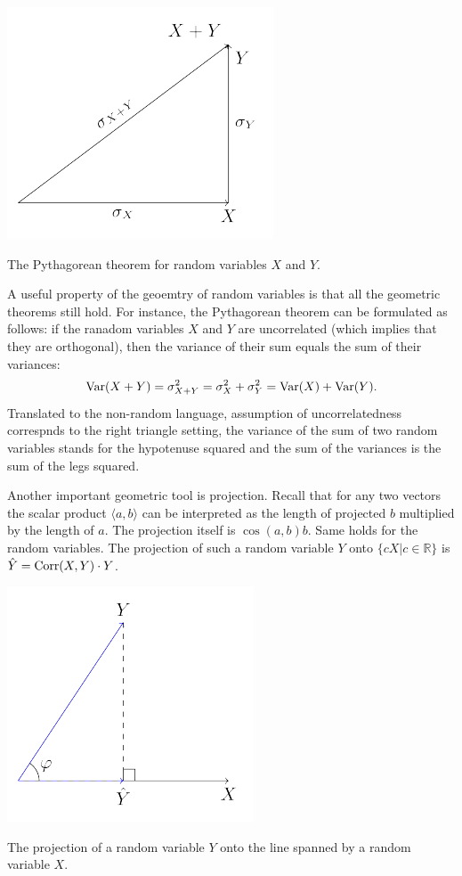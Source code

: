 
\begin{marginfigure}[10\baselineskip]
\includegraphics{figures/01_pythagorean_theorem.pdf}
\caption{The Pythagorean theorem for random variables $X$ and $Y$.}
\label{fig:rv_pyth}
\end{marginfigure}

A useful property of the geoemtry of random variables is that all the
geometric theorems still hold. For instance, the Pythagorean theorem can
be formulated as follows: if the ranadom variables $X$ and $Y$ are uncorrelated
(which implies that they are orthogonal), then the variance of their sum equals
the sum of their variances:
\[
\operatorname{Var}(X + Y) = \sigma^2_{X+Y} = \sigma^2_{X} + \sigma^2_{Y} = \operatorname{Var}(X) + \operatorname{Var}(Y).
\]
Translated to the non-random language, assumption of uncorrelatedness correspnds
to the right triangle setting, the variance of the sum of two random variables
stands for the hypotenuse squared and the sum of the variances is the sum of
the legs squared.

Another important geometric tool is projection.
Recall that for any two vectors the scalar product $\langle a, b \rangle$
can be interpreted as the length of projected $b$ multiplied by the length of $a$.
The projection itself is $\cos(a, b) b$.
Same holds for the random variables.
The projection of such a random variable $Y$ onto $\{cX| c \in \mathbb{R}\}$ is
$\hat Y = \operatorname{Corr}(X,Y) \cdot Y$.

\begin{marginfigure}
\includegraphics{figures/01_basic_projection.pdf}
\caption{The projection of a random variable $Y$ onto the line spanned by
a random variable $X$.}
\label{fig:rv_proj}
\end{marginfigure}

